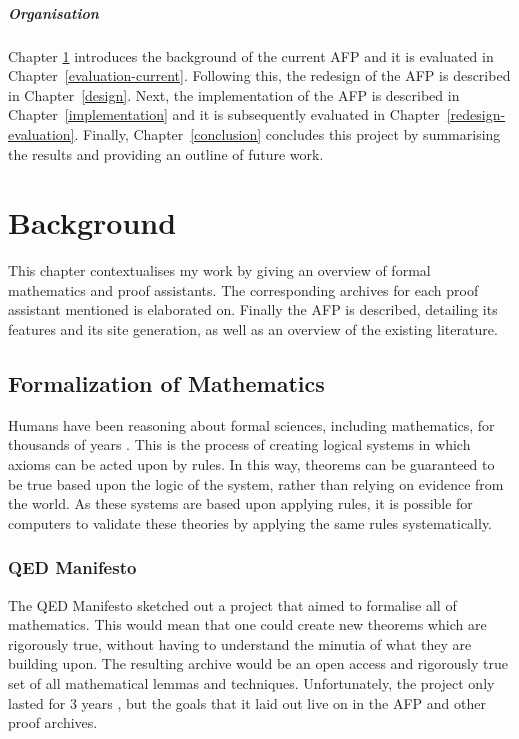 \documentclass[bsc,frontabs,oneside,singlespacing,parskip,deptreport,logo]{infthesis}
\begin{document}
\paragraph*{Organisation}

Chapter \ref{background} introduces the background of the current AFP and it is evaluated in Chapter~\ref{evaluation-current}. Following this, the redesign of the AFP is described in Chapter~\ref{design}. Next, the implementation of the AFP is described in Chapter~\ref{implementation} and it is subsequently evaluated in Chapter~\ref{redesign-evaluation}. Finally, Chapter~\ref{conclusion} concludes this project by summarising the results and providing an outline of future work.

\chapter{Background} \label{background}

This chapter contextualises my work by giving an overview of formal mathematics and proof assistants. The corresponding archives for each proof assistant mentioned is elaborated on. Finally the AFP is described, detailing its features and its site generation, as well as an overview of the existing literature.  

\section{Formalization of Mathematics}

Humans have been reasoning about formal sciences, including mathematics, for thousands of years \cite{chemla_history_2012}. This is the process of creating logical systems in which axioms can be acted upon by rules. In this way, theorems can be guaranteed to be true based upon the logic of the system, rather than relying on evidence from the world. As these systems are based upon applying rules, it is possible for computers to validate these theories by applying the same rules systematically.

\subsection{QED Manifesto}

The QED Manifesto \cite{Bundy1994TheQM} sketched out a project that aimed to formalise all of mathematics. This would mean that one could create new theorems which are rigorously true, without having to understand the minutia of what they are building upon. The resulting archive would be an open access and rigorously true set of all mathematical lemmas and techniques.  Unfortunately, the project only lasted for 3 years \cite{Wiedijk2007TheQM}, but the goals that it laid out live on in the AFP and other proof archives. %
\end{document}
